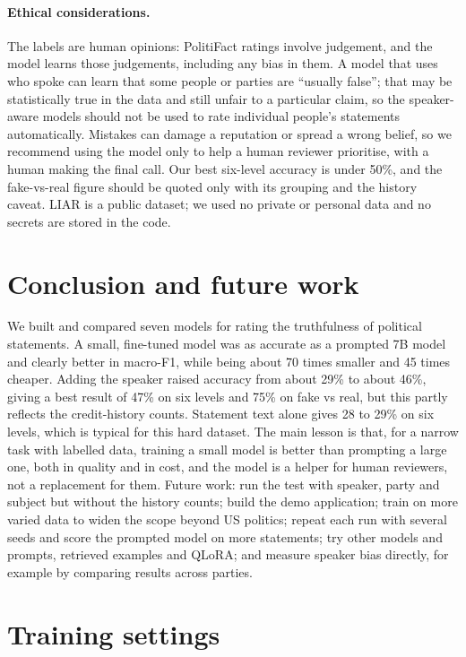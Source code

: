 \documentclass{nle}
\begin{document}
\paragraph{Ethical considerations.} The labels are human opinions: PolitiFact ratings involve judgement, and the model
learns those judgements, including any bias in them. A model that uses who spoke can learn that some people or parties
are ``usually false''; that may be statistically true in the data and still unfair to a particular claim, so the
speaker-aware models should not be used to rate individual people's statements automatically. Mistakes can damage a
reputation or spread a wrong belief, so we recommend using the model only to help a human reviewer prioritise, with a
human making the final call. Our best six-level accuracy is under 50\%, and the fake-vs-real figure should be quoted
only with its grouping and the history caveat. LIAR is a public dataset; we used no private or personal data and no
secrets are stored in the code.

\section{Conclusion and future work}

We built and compared seven models for rating the truthfulness of political statements. A small, fine-tuned model was
as accurate as a prompted 7B model and clearly better in macro-F1, while being about 70 times smaller and 45 times
cheaper. Adding the speaker raised accuracy from about 29\% to about 46\%, giving a best result of 47\% on six
levels and 75\% on fake vs real, but this partly reflects the credit-history counts. Statement text alone gives 28 to
29\% on six levels, which is typical for this hard dataset. The main lesson is that, for a narrow task with labelled
data, training a small model is better than prompting a large one, both in quality and in cost, and the model is a
helper for human reviewers, not a replacement for them. Future work: run the test with speaker, party and subject but
without the history counts; build the demo application; train on more varied data to widen the scope beyond US
politics; repeat each run with several seeds and score the prompted model on more statements; try other models and
prompts, retrieved examples and QLoRA; and measure speaker bias directly, for example by comparing results across
parties.

\appendix

\section{Training settings}\label{app:settings}
\end{document}
